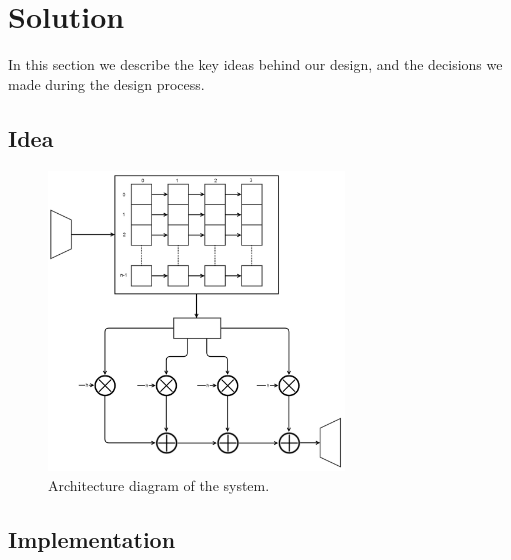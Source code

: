 \section{Solution}
In this section we describe the key ideas behind our design, and the decisions we made during the design process.
\subsection{Idea}

\begin{figure}
\begin{center}
\includegraphics[width=0.7\textwidth]{images/architecture.png}
\caption{Architecture diagram of the system.}
\label{fig:architecture}
\end{center}
\end{figure}

\subsection{Implementation}
